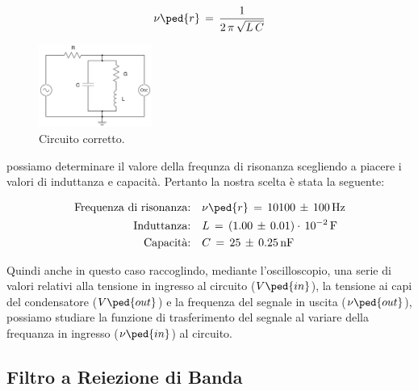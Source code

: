\begin{equation}
	\nu\ped{r} \,=\, \frac{1}{2\,\pi\,\sqrt{L\,C}}
	\label{eq:risonanza banda}
\end{equation}
%
\begin{figure}
  \vspace{-0.5cm}
  \includegraphics[width=0.33\textwidth]{s_corr2.pdf}
  \caption{Circuito corretto.}
  \label{fig:corr2}
  \vspace{-1.5cm}
\end{figure}
%
possiamo determinare il valore della frequnza di risonanza scegliendo a piacere i valori di induttanza e capacità. Pertanto la nostra scelta è stata la seguente:

\begin{align*}
	\text{Frequenza di risonanza:}& \quad \nu\ped{r} \,=\, 10100 \,\pm\, 100 \, \si{\hertz} \\
	\text{Induttanza:}& \quad L \,=\, (1.00 \,\pm\, 0.01)\cdot\,10^{-2} \, \si{\farad} \\
	\text{Capacità:}& \quad C \,=\, 25 \,\pm\, 0.25 \, \si{\nano\farad} \\
\end{align*}

Quindi anche in questo caso raccoglindo, mediante l'oscilloscopio, una serie di valori relativi alla tensione in ingresso al circuito ($V\ped{in}$), la tensione ai capi del condensatore ($V\ped{out}$) e la frequenza del segnale in uscita ($\nu\ped{out}$), possiamo studiare la funzione di trasferimento del segnale al variare della frequanza in ingresso ($\nu\ped{in}$) al circuito.

\subsection*{Filtro a Reiezione di Banda}

